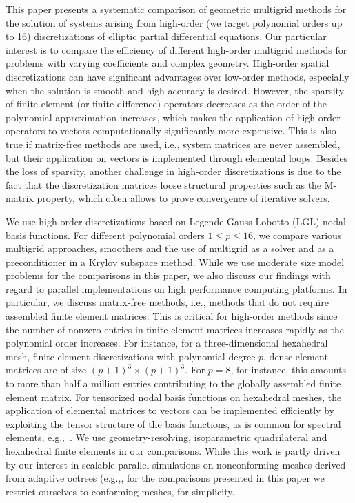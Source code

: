 \documentclass[smallcondensed,final]{svjour3}     %
\begin{document}
This paper presents a systematic comparison of geometric multigrid
methods for the solution of systems arising from high-order (we
target polynomial orders up to 16) discretizations of elliptic partial
differential equations. Our particular interest is to compare the
efficiency of different high-order multigrid methods for problems with
varying coefficients and complex geometry.
High-order spatial discretizations can have significant advantages
over low-order methods, especially when the solution is smooth and
high accuracy is desired. However, the sparsity of finite element (or
finite difference) operators decreases as the order of the polynomial approximation
increases, which makes the application of high-order operators
to vectors computationally significantly more expensive. This is also
true if matrix-free methods are used, i.e., system matrices are never
assembled, but their application on vectors is implemented through
elemental loops.  Besides the loss of sparsity, another challenge in
high-order discretizations is due to the fact that the discretization
matrices loose structural properties such as the M-matrix property,
which often allows to prove convergence of iterative solvers.

We use high-order discretizations based on Legende-Gauss-Lobotto (LGL)
nodal basis functions. For different polynomial orders $1\le p\le 16$,
we compare various multigrid approaches, smoothers and the use of
multigrid as a solver and as a preconditioner in a Krylov subspace
method.
While we use moderate size model problems for the comparisons in this
paper, we also discuss our findings with regard to parallel
implementations on high performance computing platforms.  In
particular, we discuss matrix-free methods, i.e., methods that do not
require assembled finite element matrices. This is critical for
high-order methods since the number of nonzero entries in finite
element matrices increases rapidly as the polynomial order
increases. For instance, for a three-dimensional hexahedral mesh,
finite element discretizations with polynomial degree $p$, dense
element matrices are of size $(p+1)^3\times (p+1)^3$. For $p=8$, for
instance, this amounts to more than half a million entries
contributing to the globally assembled finite element matrix.  For
tensorized nodal basis functions on hexahedral meshes, the application
of elemental matrices to vectors can be implemented efficiently by
exploiting the tensor structure of the basis functions, as is common
for spectral elements, e.g.,~\cite{DevilleFischerMund02}. We use
geometry-resolving, isoparametric quadrilateral and hexahedral finite
elements in our comparisons. While this work is partly driven by our
interest in scalable parallel simulations on nonconforming meshes
derived from adaptive octrees (e.g.,\cite{SundarBirosBursteddeEtAl12,
  SampathBiros10, BursteddeGhattasGurnisEtAl10}, for the comparisons
presented in this paper we restrict ourselves to conforming meshes,
for simplicity.
\end{document}
